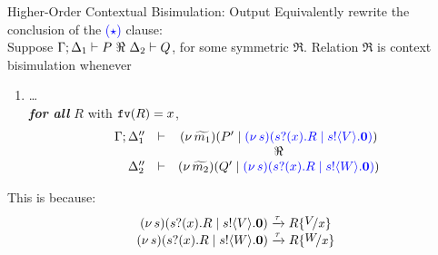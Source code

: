 \documentclass{beamer}
\newcommand{\prcolor}[1]{{\color{blue} #1}}
\begin{document}
	\begin{frame}{Higher-Order Contextual Bisimulation: Output}
		Equivalently rewrite the conclusion of the \textcolor{blue}{($\star$)} clause:
		\\[2mm]

		Suppose $\Gamma; \Delta_1 \proves P\ \Re\ \Delta_2 \proves Q$, for some symmetric $\Re$. Relation $\Re$ is
		context bisimulation whenever
		\begin{enumerate}[$(\star)$]
			\item	\dots\\
				\emph{\textbf{for all} $R$}  with $\mathtt{fv}(R)=x$, 
				\[
					\begin{array}{rcc}
						\Gamma; \Delta_1'' &\proves& \newsp{\widetilde{m_1}}{P' \Par \prcolor{\newsp{s}{\binp{s}{x} R \Par  \bout{s}{V} \inact}}}
						\\
						&&\Re
						\\
						\Delta_2'' &\proves&  \newsp{\widetilde{m_2}}{Q' \Par \prcolor{\newsp{s}{\binp{s}{x} R \Par \bout{s}{W} \inact}}}
					\end{array}
				\]
		\end{enumerate}
		This is because:
		\[
			\begin{array}{c}
				\newsp{s}{\binp{s}{x} R \Par \bout{s}{V} \inact}
				\by{\tau}
				R \subst{V}{x}
				\\
				\newsp{s}{\binp{s}{x} R \Par \bout{s}{W} \inact}
				\by{\tau}
				R \subst{W}{x}
			\end{array}
		\]
	\end{frame}
\end{document}

